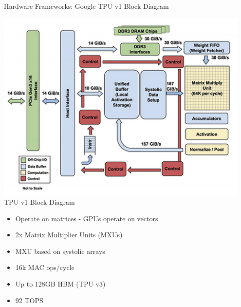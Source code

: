 \begin{frame}{Hardware Frameworks: Google TPU v1 Block Diagram}
	\begin{minipage}{0.4\textwidth}
		\centering
		\includegraphics[width=0.95\textwidth]{../Images/Hardware/tpu-v1-block-diagram.png}\\
		TPU v1 Block Diagram
	\end{minipage}%
	\begin{minipage}{0.6\textwidth}
		\begin{itemize}
			\item Operate on matrices - GPUs operate on vectors
			\item 2x Matrix Multiplier Units (MXUs)
			\item MXU based on systolic arrays
			\item 16k MAC ops/cycle
			\item Up to 128GB HBM (TPU v3)
			\item 92 TOPS
		\end{itemize}
	\end{minipage}
\end{frame}

